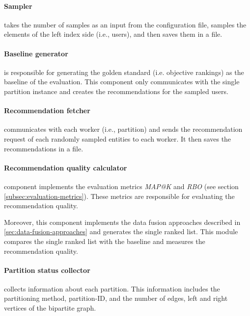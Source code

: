 \paragraph{Sampler}
takes the number of samples as an input from the configuration file, samples the elements of the left index side (i.e., users), and then saves them in a file.

\paragraph{Baseline generator}
is responsible for generating the golden standard (i.e. objective rankings) as the baseline of the evaluation. This component only communicates with the single partition instance and creates the recommendations for the sampled users.

\paragraph{Recommendation fetcher}
communicates with each worker (i.e., partition) and sends the recommendation request of each randomly sampled entities to each worker. It then saves the recommendations in a file.

\paragraph{Recommendation quality calculator}
component implements the evaluation metrics \emph{MAP@K} and \emph{RBO} (see section \ref{subsec:evaluation-metrics}). These metrics are responsible for evaluating the recommendation quality.

Moreover, this component implements the data fusion approaches described in \ref{sec:data-fusion-approaches} and generates the single ranked list. This module compares the single ranked list with the baseline and measures the recommendation quality.


\paragraph{Partition status collector}
collects information about each partition. This information includes the partitioning method, partition-ID, and the number of edges, left and right vertices of the bipartite graph.


